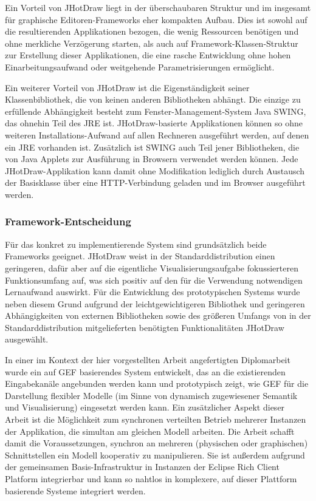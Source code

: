 Ein Vorteil von JHotDraw liegt in der überschaubaren Struktur und im insgesamt für graphische Editoren-Frameworks eher kompakten Aufbau. Dies ist sowohl auf die resultierenden Applikationen bezogen, die wenig Ressourcen benötigen und ohne merkliche Verzögerung starten, als auch auf Framework-Klassen-Struktur zur Erstellung dieser Applikationen, die eine rasche Entwicklung ohne hohen Einarbeitungsaufwand oder weitgehende Parametrisierungen ermöglicht.

Ein weiterer Vorteil von JHotDraw ist die Eigenständigkeit seiner Klassenbibliothek, die von keinen anderen Bibliotheken abhängt. Die einzige zu erfüllende Abhängigkeit besteht zum Fenster-Management-System Java SWING, das ohnehin Teil des \gls{JRE} ist. JHotDraw-basierte Applikationen können so ohne weiteren Installations-Aufwand auf allen Rechneren ausgeführt werden, auf denen ein \gls{JRE} vorhanden ist. Zusätzlich ist SWING auch Teil jener Bibliotheken, die von Java Applets zur Ausführung in Browsern verwendet werden können. Jede JHotDraw-Applikation kann damit ohne Modifikation lediglich durch Austausch der Basisklasse über eine \gls{HTTP}-Verbindung geladen und im Browser ausgeführt werden.


\subsubsection{Framework-Entscheidung} %
\label{ssub:output:framework_entscheidung}

Für das konkret zu implementierende System sind grundsätzlich beide Frameworks geeignet. JHotDraw weist in der Standarddistribution einen geringeren, dafür aber auf die eigentliche Visualisierungsaufgabe fokussierteren Funktionsumfang auf, was sich positiv auf den für die Verwendung notwendigen Lernaufwand auswirkt. Für die Entwicklung des prototypischen Systems wurde neben diesem Grund aufgrund der leichtgewichtigeren Bibliothek und geringeren Abhängigkeiten von externen Bibliotheken sowie des größeren Umfangs von in der Standarddistribution mitgelieferten benötigten Funktionalitäten JHotDraw ausgewählt.

In einer im Kontext der hier vorgestellten Arbeit angefertigten Diplomarbeit \citep{Feiner08} wurde ein auf \gls{GEF} basierendes System entwickelt, das an die existierenden Eingabekanäle angebunden werden kann und prototypisch zeigt, wie \gls{GEF} für die Darstellung flexibler Modelle (im Sinne von dynamisch zugewiesener Semantik und Visualisierung) eingesetzt werden kann. Ein zusätzlicher Aspekt dieser Arbeit ist die Möglichkeit zum synchronen verteilten Betrieb mehrerer Instanzen der Applikation, die simultan am gleichen Modell arbeiten. Die Arbeit schafft damit die Voraussetzungen, synchron an mehreren (physischen oder graphischen) Schnittstellen ein Modell kooperativ zu manipulieren. Sie ist außerdem aufgrund der gemeinsamen Basis-Infrastruktur in Instanzen der Eclipse Rich Client Platform \citep{McAffer05} integrierbar und kann so nahtlos in komplexere, auf dieser Plattform basierende Systeme integriert werden.

